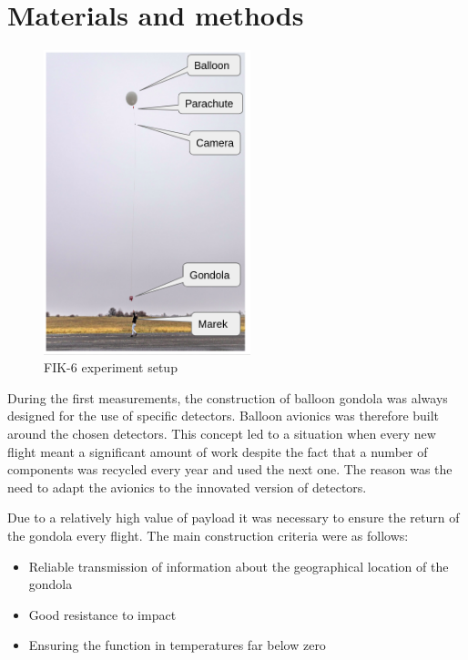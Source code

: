 \documentclass{Rpd}
\begin{document}
\section{Materials and methods}

\begin{center}
\begin{figure}%
	\centerline{\includegraphics[width=60mm]{img/FIK-6_experiment_setup.png}}
	\caption{FIK-6 experiment setup \label{FIK-6_setup}}
\end{figure}
\end{center}

During the first measurements, the construction of balloon gondola was always designed for the use of specific detectors. Balloon avionics was therefore built around the chosen detectors.
This concept led to a situation when every new flight meant a significant amount of work despite the fact that a number of components was recycled every year and used the next one. The reason was the need to adapt the avionics to the innovated version of detectors.

Due to a relatively high value of payload it was necessary to ensure the return of the gondola every flight. The main construction criteria were as follows:


\begin{itemize}
\item Reliable transmission of information about the geographical location of the gondola
\item Good resistance to impact
\item Ensuring the function in temperatures far below zero
\end{itemize}
\end{document}
